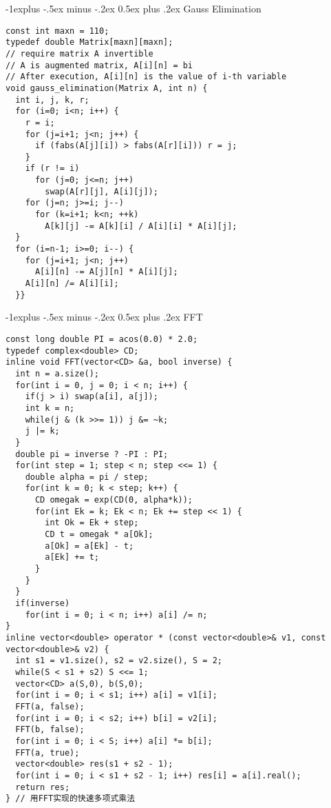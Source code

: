 \documentclass[10pt,landscape]{article}
\makeatletter
\renewcommand{\subsection}{\@startsection{subsection}{2}{0mm}%
                                {-1explus -.5ex minus -.2ex}%
                                {0.5ex plus .2ex}%
                                {\normalfont\normalsize\bfseries}}
\makeatother
\begin{document}
\begin{multicols}{2}
\subsection{Gauss Elimination}
\begin{lstlisting}
const int maxn = 110;
typedef double Matrix[maxn][maxn];
// require matrix A invertible
// A is augmented matrix, A[i][n] = bi
// After execution, A[i][n] is the value of i-th variable
void gauss_elimination(Matrix A, int n) {
  int i, j, k, r;
  for (i=0; i<n; i++) {
    r = i;
    for (j=i+1; j<n; j++) {
      if (fabs(A[j][i]) > fabs(A[r][i])) r = j;
    }
    if (r != i)
      for (j=0; j<=n; j++)
        swap(A[r][j], A[i][j]);
    for (j=n; j>=i; j--) 
      for (k=i+1; k<n; ++k)
        A[k][j] -= A[k][i] / A[i][i] * A[i][j];
  }
  for (i=n-1; i>=0; i--) {
    for (j=i+1; j<n; j++)
      A[i][n] -= A[j][n] * A[i][j];
    A[i][n] /= A[i][i];
  }}
\end{lstlisting}

\subsection{FFT}
\begin{lstlisting}
const long double PI = acos(0.0) * 2.0;
typedef complex<double> CD;
inline void FFT(vector<CD> &a, bool inverse) {
  int n = a.size();
  for(int i = 0, j = 0; i < n; i++) {
    if(j > i) swap(a[i], a[j]);
    int k = n;
    while(j & (k >>= 1)) j &= ~k;
    j |= k;
  }
  double pi = inverse ? -PI : PI;
  for(int step = 1; step < n; step <<= 1) {
    double alpha = pi / step;
    for(int k = 0; k < step; k++) {
      CD omegak = exp(CD(0, alpha*k)); 
      for(int Ek = k; Ek < n; Ek += step << 1) { 
        int Ok = Ek + step; 
        CD t = omegak * a[Ok];
        a[Ok] = a[Ek] - t; 
        a[Ek] += t;
      }
    }
  }
  if(inverse)
    for(int i = 0; i < n; i++) a[i] /= n;
}
inline vector<double> operator * (const vector<double>& v1, const vector<double>& v2) {
  int s1 = v1.size(), s2 = v2.size(), S = 2;
  while(S < s1 + s2) S <<= 1;
  vector<CD> a(S,0), b(S,0); 
  for(int i = 0; i < s1; i++) a[i] = v1[i];
  FFT(a, false);
  for(int i = 0; i < s2; i++) b[i] = v2[i];
  FFT(b, false);
  for(int i = 0; i < S; i++) a[i] *= b[i];
  FFT(a, true);
  vector<double> res(s1 + s2 - 1);
  for(int i = 0; i < s1 + s2 - 1; i++) res[i] = a[i].real(); 
  return res;
} // 用FFT实现的快速多项式乘法
\end{lstlisting}


\end{multicols}
\end{document}
